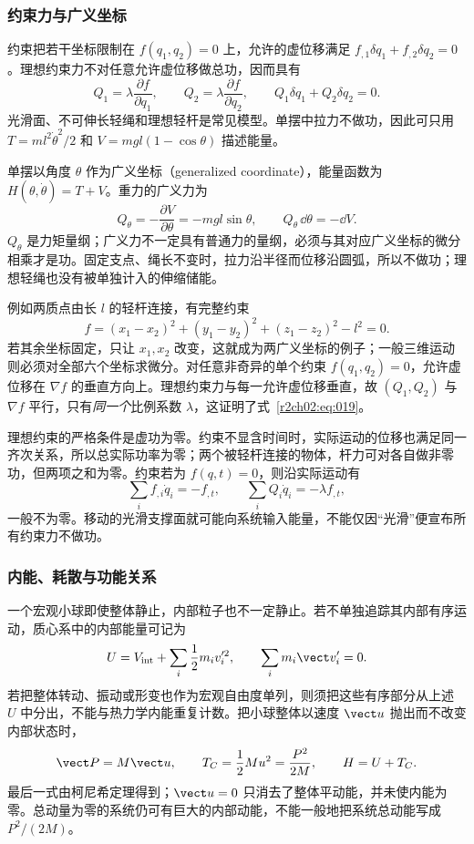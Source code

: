 \subsubsection{约束力与广义坐标}
\label{r2ch02:sec:constraints}

约束把若干坐标限制在 $f(q_1,q_2)=0$ 上，允许的虚位移满足
$f_{,1}\delta q_1+f_{,2}\delta q_2=0$。理想约束力不对任意允许虚位移做总功，因而具有
\begin{equation}
 Q_1=\lambda\frac{\partial f}{\partial q_1},\qquad
 Q_2=\lambda\frac{\partial f}{\partial q_2},\qquad
 Q_1\delta q_1+Q_2\delta q_2=0.
 \label{r2ch02:eq:019}
\end{equation}
光滑面、不可伸长轻绳和理想轻杆是常见模型。单摆中拉力不做功，因此可只用 $T=ml^2\dot\theta^2/2$ 和 $V=mgl(1-\cos\theta)$ 描述能量。

单摆以角度 $\theta$ 作为广义坐标（generalized coordinate），能量函数为 $H(\theta,\dot\theta)=T+V$。重力的广义力为
\[
 Q_\theta=-\frac{\partial V}{\partial\theta}=-mgl\sin\theta,
 \qquad Q_\theta\,\dd\theta=-\dd V.
\]
$Q_\theta$ 是力矩量纲；广义力不一定具有普通力的量纲，必须与其对应广义坐标的微分相乘才是功。固定支点、绳长不变时，拉力沿半径而位移沿圆弧，所以不做功；理想轻绳也没有被单独计入的伸缩储能。

例如两质点由长 $l$ 的轻杆连接，有完整约束
\[
 f=(x_1-x_2)^2+(y_1-y_2)^2+(z_1-z_2)^2-l^2=0.
\]
若其余坐标固定，只让 $x_1,x_2$ 改变，这就成为两广义坐标的例子；一般三维运动则必须对全部六个坐标求微分。对任意非奇异的单个约束 $f(q_1,q_2)=0$，允许虚位移在 $\nabla f$ 的垂直方向上。理想约束力与每一允许虚位移垂直，故 $(Q_1,Q_2)$ 与 $\nabla f$ 平行，只有\emph{同一个}比例系数 $\lambda$，这证明了式~\eqref{r2ch02:eq:019}。

理想约束的严格条件是虚功为零。约束不显含时间时，实际运动的位移也满足同一齐次关系，所以总实际功率为零；两个被轻杆连接的物体，杆力可对各自做非零功，但两项之和为零。约束若为 $f(q,t)=0$，则沿实际运动有
\[
 \sum_i f_{,i}\dot q_i=-f_{,t},\qquad
 \sum_i Q_i\dot q_i=-\lambda f_{,t},
\]
一般不为零。移动的光滑支撑面就可能向系统输入能量，不能仅因“光滑”便宣布所有约束力不做功。

\subsubsection{内能、耗散与功能关系}
\label{r2ch02:sec:dissipation}

一个宏观小球即使整体静止，内部粒子也不一定静止。若不单独追踪其内部有序运动，质心系中的内部能量可记为
\[
 U=V_{\rm int}+\sum_i\frac12m_i v_i'^2,\qquad
 \sum_i m_i\vect v_i'=0.
\]
若把整体转动、振动或形变也作为宏观自由度单列，则须把这些有序部分从上述 $U$ 中分出，不能与热力学内能重复计数。把小球整体以速度 $\vect u$ 抛出而不改变内部状态时，
\[
 \vect P=M\vect u,\qquad T_C=\frac12Mu^2=\frac{P^2}{2M},\qquad
 H=U+T_C.
\]
最后一式由柯尼希定理得到；$\vect u=0$ 只消去了整体平动能，并未使内能为零。总动量为零的系统仍可有巨大的内部动能，不能一般地把系统总动能写成 $P^2/(2M)$。

